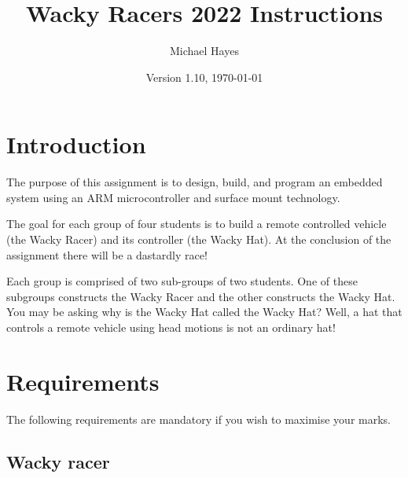 \documentclass[11pt, a4paper]{article}
\title{Wacky Racers 2022 Instructions}
\author{Michael Hayes}
\date{Version 1.10, \today}
\begin{document}
\maketitle

\section{Introduction}

The purpose of this assignment is to design, build, and program an
embedded system using an ARM microcontroller and surface mount
technology.

The goal for each group of four students is to build a remote
controlled vehicle (the Wacky Racer) and its controller (the Wacky
Hat).  At the conclusion of the assignment there will be a dastardly race!

Each group is comprised of two sub-groups of two students.  One of
these subgroups constructs the Wacky Racer and the other constructs
the Wacky Hat.  You may be asking why is the Wacky Hat called the
Wacky Hat?  Well, a hat that controls a remote vehicle using head
motions is not an ordinary hat!


\section{Requirements}

The following requirements are mandatory if you wish to maximise your
marks.


\subsection{Wacky racer}
\end{document}
